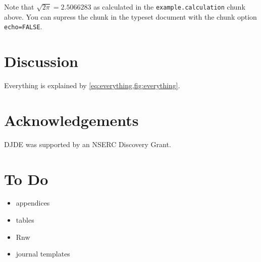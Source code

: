 \documentclass[12pt]{article}\usepackage[]{graphicx}\usepackage[]{xcolor}
\begin{document}
Note that $\sqrt{2\pi}=2.5066283$ as calculated in the
\texttt{example.calculation} chunk above.  You can supress
the chunk in the typeset document with the chunk option
\texttt{echo=FALSE}.

\section{Discussion}\label{sec:discussion}

Everything is explained by \cref{eq:everything,fig:everything}.

\section*{Acknowledgements}

DJDE was supported by an NSERC Discovery Grant.







\appendix

\section{To Do}\label{app:ToDo}

\begin{itemize}
\item appendices
\item tables
\item Rnw
\item journal templates
\end{itemize}
\end{document}
